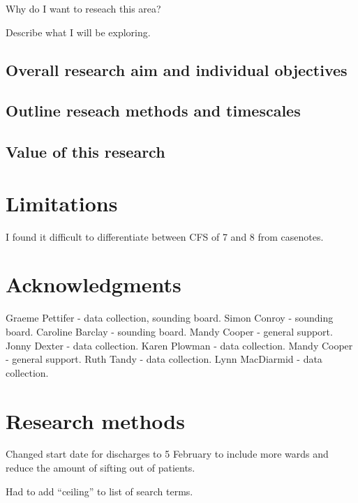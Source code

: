 \documentclass
[
	12pt,
	a4paper,
	oneside,
]{article}
\begin{document}
Why do I want to reseach this area?

Describe what I will be exploring.

\subsection{Overall research aim and individual objectives}

\subsection{Outline reseach methods and timescales}

\subsection{Value of this research}

\section{Limitations}
I found it difficult to differentiate between CFS of 7 and 8 from casenotes.

\section{Acknowledgments}
Graeme Pettifer - data collection, sounding board.
Simon Conroy - sounding board.
Caroline Barclay - sounding board.
Mandy Cooper - general support.
Jonny Dexter - data collection.
Karen Plowman - data collection.
Mandy Cooper - general support.
Ruth Tandy - data collection.
Lynn MacDiarmid - data collection.

\section{Research methods}

Changed start date for discharges to 5 February to include more wards and reduce
the amount of sifting out of patients.

Had to add ``ceiling'' to list of search terms.

\clearpage
\printbibliography
\end{document}

